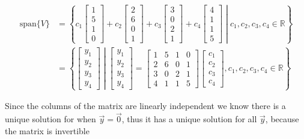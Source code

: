\documentclass{article}
\begin{document}
\begin{enumerate}[(i)]
    \begin{align*}
        \text{span}\{{V}\} &= \left\{c_1\begin{bmatrix}
        1\\5\\1\\0
        \end{bmatrix} + c_2\begin{bmatrix}
        2\\6\\0\\1
        \end{bmatrix} + c_3\begin{bmatrix}
        3\\0\\2\\1
        \end{bmatrix} + c_4\begin{bmatrix}
        4\\1\\1\\5
        \end{bmatrix}\middle| c_1,c_2,c_3,c_4 \in \mathbb{R}\right\}
        \\
        & = \left\{\begin{bmatrix}
        y_1\\y_2\\y_3\\y_4
        \end{bmatrix} \middle| \begin{bmatrix}
        y_1\\y_2\\y_3\\y_4
        \end{bmatrix} = \begin{bmatrix}
        1&5&1&0\\2&6&0&1 \\3&0&2&1 \\ 4&1&1&5
        \end{bmatrix}\begin{bmatrix}
        c_1\\c_2\\c_3\\c_4
        \end{bmatrix}, c_1,c_2,c_3,c_4 \in \mathbb{R}\right\}
    \end{align*}

    Since the columns of the matrix are linearly independent
    we know there is a unique solution for when \(\vec{y} = \vec{0}\), thus it has a unique solution for all \(\vec{y}\),
    because the matrix is invertible


\end{enumerate}
\end{document}
